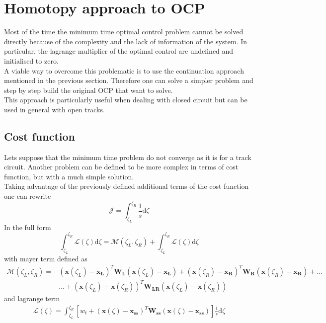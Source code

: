 \section{Homotopy approach to OCP}
\label{sec:Homotopy}  
%
Most of the time the minimum time optimal control problem cannot be solved directly because of the complexity and the lack of information of the system. In particular, the lagrange multiplier of the optimal control are undefined and initialised to zero.\\
A viable way to overcome this problematic is to use the continuation approach mentioned in the previous section. Therefore one can solve a simpler problem and step by step build the original OCP that want to solve.\\
This approach is particularly useful when dealing with closed circuit but can be used in general with open tracks.
%
\subsection{Cost function}
%
Lets suppose that the minimum time problem do not converge as it is for a track circuit. Another problem can be defined to be more complex in terms of cost function, but with a much simple solution.\\
Taking advantage of the previously defined additional terms of the cost function one can rewrite 
%
\begin{equation}
    \mathcal{J} = \int_{\zeta_L}^{\zeta_R} \frac{1}{\dot{s}} \mathrm{d}\zeta  
\end{equation}
%
In the full form
%
\begin{equation}
    \int_{\zeta_L}^{\zeta_R} \mathcal{L}(\zeta)\mathrm{d}\zeta = \mathcal{M}({\zeta_L},{\zeta_R}) + \int_{\zeta_L}^{\zeta_R} \mathcal{L}(\zeta) \mathrm{d}\zeta  
\end{equation}
%
with mayer term defined as 
%
\begin{equation}
    \begin{split}
    \mathcal{M}({\zeta_L},{\zeta_R}) = 
    &(\mathbf{x}(\zeta_L)-\mathbf{x_L})^T \mathbf{W_{L}} (\mathbf{x}(\zeta_L)-\mathbf{x_L}) + (\mathbf{x}(\zeta_R)-\mathbf{x_R})^T \mathbf{W_{R}} (\mathbf{x}(\zeta_R)-\mathbf{x_R}) + \dots\\
    &\dots + (\mathbf{x}(\zeta_L)-\mathbf{x}(\zeta_R))^T \mathbf{W_{LR}} (\mathbf{x}(\zeta_L)-\mathbf{x}(\zeta_R))
\end{split}
\end{equation}
%
and lagrange term
%
\begin{equation}
    \begin{split}
    \mathcal{L}({\zeta}) =  \int_{\zeta_L}^{\zeta_R} [ w_t + (\mathbf{x}(\zeta)-\mathbf{x_{ss}})^T \mathbf{W_{ss}}  (\mathbf{x}(\zeta)-\mathbf{x_{ss}}) ] \frac{1}{\dot{s}} \mathrm{d}\zeta
\end{split}
\end{equation}
%
